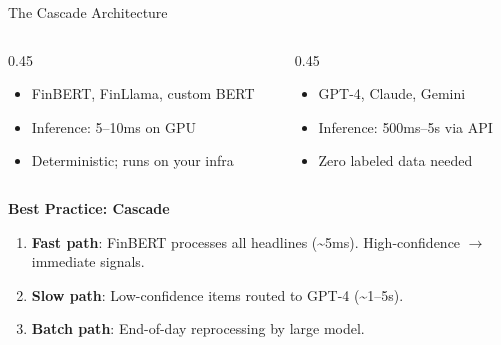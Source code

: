 \documentclass[aspectratio=169]{beamer}
\begin{document}
\begin{frame}{The Cascade Architecture}
\begin{columns}[T]
\begin{column}{0.45\textwidth}
\begin{shadedbox}[title=\textbf{Fine-Tuned Small Model}]
\begin{itemize}\footnotesize
  \item FinBERT, FinLlama, custom BERT
  \item Inference: \alert{5--10ms} on GPU
  \item Deterministic; runs on your infra
\end{itemize}
\end{shadedbox}
\end{column}
\begin{column}{0.45\textwidth}
\begin{shadedbox}[title=\textbf{General-Purpose LLM}]
\begin{itemize}\footnotesize
  \item GPT-4, Claude, Gemini
  \item Inference: \alert{500ms--5s} via API
  \item Zero labeled data needed
\end{itemize}
\end{shadedbox}
\end{column}
\end{columns}
\vspace{0.2cm}
\textbf{Best Practice: Cascade}
\begin{enumerate}\footnotesize
  \item \textbf{Fast path}: FinBERT processes all headlines (\textasciitilde5ms). High-confidence $\rightarrow$ immediate signals.
  \item \textbf{Slow path}: Low-confidence items routed to GPT-4 (\textasciitilde1--5s).
  \item \textbf{Batch path}: End-of-day reprocessing by large model.
\end{enumerate}
\end{frame}
\end{document}
